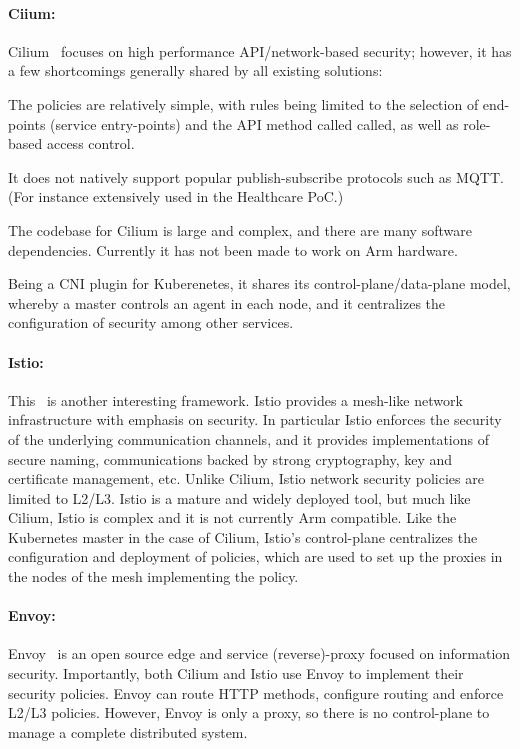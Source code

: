 \documentclass[a4paper%
]{article}
\begin{document}
\paragraph{\sc Ciium:} Cilium~\cite{cilium} focuses on high
performance API/network-based security; however, it has a few
shortcomings generally shared by all existing solutions:
\begin{inparaenum}
\item The policies are relatively simple, with rules being limited to
  the selection of end-points (service entry-points) and the API
  method called called, as well as role-based access control. 
\item It does not natively support popular publish-subscribe protocols
  such as MQTT.
  (For instance extensively used in the Healthcare PoC.)
\item The codebase for Cilium is large and complex, and there are many
  software dependencies.
  Currently it has not been made to work on Arm hardware.
\item Being a CNI plugin for Kuberenetes, it shares its
  control-plane/data-plane model, whereby a master controls an agent
  in each node, and it centralizes the configuration of security among
  other services.
\end{inparaenum}

\paragraph{\sc Istio:} This~\cite{istio} is another interesting
framework.
% 
Istio provides a mesh-like network infrastructure with emphasis on
security.
%
In particular Istio enforces the security of the underlying
communication channels, and it provides implementations of secure
naming, communications backed by strong cryptography, key and
certificate management, etc.
%
Unlike Cilium, Istio network security policies are limited to L2/L3. 
%
Istio is a mature and widely deployed tool, but much like Cilium,
Istio is complex and it is not currently Arm compatible.
%
Like the Kubernetes master in the case of Cilium, Istio's
control-plane centralizes the configuration and deployment of
policies, which are used to set up the proxies in the nodes of the
mesh implementing the policy.

\paragraph{\sc Envoy:} Envoy~\cite{envoy} is an open source edge and
service (reverse)-proxy focused on information security.
%
Importantly, both Cilium and Istio use Envoy to implement their
security policies.
%
Envoy can route HTTP methods, configure routing and enforce L2/L3
policies.
%
However, Envoy is only a proxy, so there is no control-plane to manage
a complete distributed system. 
\end{document}
